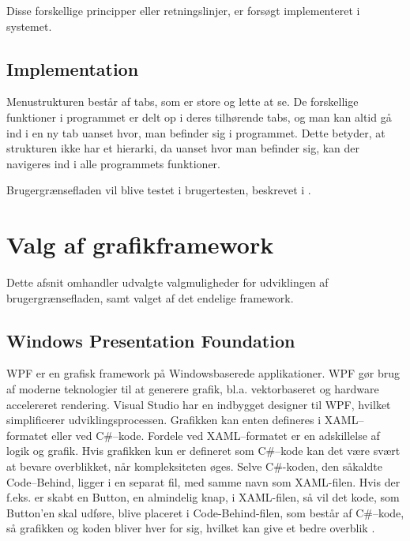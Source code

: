 Disse forskellige principper eller retningslinjer, er forsøgt implementeret i systemet.


\subsection{Implementation}\label{sec:Implementation}

Menustrukturen består af tabs, som er store og lette at se.
De forskellige funktioner i programmet er delt op i deres tilhørende tabs, og man kan altid gå ind i en ny tab uanset hvor, man befinder sig i programmet. 
Dette betyder, at strukturen ikke har et hierarki, da uanset hvor man befinder sig, kan der navigeres ind i alle programmets funktioner.

Brugergrænsefladen vil blive testet i brugertesten, beskrevet i .

\section{Valg af grafikframework} 
Dette afsnit omhandler udvalgte valgmuligheder for udviklingen af brugergrænsefladen, samt valget af det endelige framework.

\subsection{Windows Presentation Foundation}
\ac{WPF} er en grafisk framework på Windowsbaserede applikationer. 
WPF gør brug af moderne teknologier til at generere grafik, bl.a. vektorbaseret og hardware accelereret rendering.
Visual Studio har en indbygget designer til WPF, hvilket simplificerer udviklingsprocessen. 
Grafikken kan enten defineres i \ac{XAML}--formatet eller ved C\#--kode. 
Fordele ved \ac{XAML}--formatet er en adskillelse af logik og grafik. 
Hvis grafikken kun er defineret som C\#--kode kan det være svært at bevare overblikket, når kompleksiteten øges.
Selve C\#-koden, den såkaldte Code--Behind, ligger i en separat fil, med samme navn som XAML-filen. 
Hvis der f.eks. er skabt en Button, en almindelig knap, i XAML-filen, så vil det kode, som Button'en skal udføre, blive placeret i Code-Behind-filen, som består af C\#--kode, så grafikken og koden bliver hver for sig, hvilket kan give et bedre overblik \citep{wpf}. 

